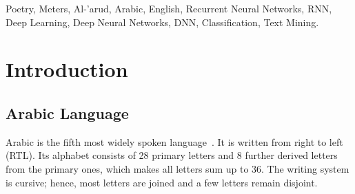 \documentclass[journal,10pt,twocolumns,letter]{IEEEtran}
\begin{document}
\begin{IEEEkeywords}
  Poetry, Meters, Al-'arud, Arabic, English, Recurrent Neural Networks, RNN, Deep Learning, Deep Neural
  Networks, DNN, Classification, Text Mining.
\end{IEEEkeywords}





\section{Introduction}\label{sec:introduction}

\subsection{Arabic Language}\label{sec:arabic-language}
Arabic is the fifth most widely spoken language~\cite{Simons201720thEditionEthnologue}.  It is
written from right to left (RTL). Its alphabet consists of 28 primary letters and 8 further derived
letters from the primary ones, which makes all letters sum up to 36.  The writing system is cursive;
hence, most letters are joined and a few letters remain disjoint.

\begin{table}[!t]
  \centering
  \caption{\textit{The 4 Diacritics of Arabic Language. Transliterated names (1st row), writing
      style on example letter \<د>} (2nd row), and corresponding short pronunciation
    vowel (3rd row).}\label{arabic:diacritics_dal}
\end{table}
\end{document}
